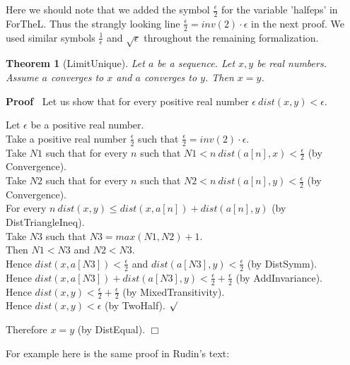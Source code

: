 \documentclass{article}
\newenvironment{forthel}{\begin{leftbar}}{\end{leftbar}}
\newenvironment{proof}{\noindent\textbf{Proof\ }}{\hspace*{\fill}$\Box$\medskip}
\newenvironment{subproof}{\begin{list}{}{}
		\item[\text{Proof}]}{\hfill $\surd$ \end{list}}
\newtheorem{theorem}{Theorem}
\newcommand{\halfeps}{\frac{\epsilon}{2}}
\newcommand{\inveps}{\frac{1}{\epsilon}}
\newcommand{\rooteps}{\sqrt{\epsilon}}
\begin{document}
\noindent Here we should note that we added the symbol $\halfeps$ for the variable 'halfeps' in ForTheL. Thus the strangly looking line $\halfeps = inv(2) \cdot \epsilon$ in the next proof. We used similar symbols $\inveps$ and $\rooteps$ throughout the remaining formalization.

\begin{forthel}
	\begin{theorem}[LimitUnique]
		Let $a$ be a sequence. Let $x, y$ be real numbers. Assume $a$ converges to $x$ and $a$ converges to $y$.
		Then $x = y$.
	\end{theorem}

	\begin{proof}
		Let us show that for every positive real number $\epsilon \ dist(x,y) < \epsilon$.
		\begin{subproof}
			Let $\epsilon$ be a positive real number.\\
			Take a positive real number $\halfeps$ such that $\halfeps = inv(2) \cdot \epsilon$.\\
			Take $N1$ such that for every $n$ such that $N1 < n \ dist(a[n],x) < \halfeps$ (by Convergence).\\
			Take $N2$ such that for every $n$ such that $N2 < n \ dist(a[n],y) < \halfeps$ (by Convergence).\\
			For every $n \ dist(x,y) \leq dist(x,a[n]) + dist(a[n],y)$ (by DistTriangleIneq). \\
			Take $N3$ such that $N3 = max(N1,N2) + 1$.\\
			Then $N1 < N3$ and $N2 < N3$.\\
			Hence $dist(x,a[N3]) < \halfeps$ and $dist(a[N3],y) < \halfeps$ (by DistSymm).\\
			Hence $dist(x,a[N3]) + dist(a[N3],y) < \halfeps + \halfeps$ (by AddInvariance).\\
			Hence $dist(x,y) < \halfeps + \halfeps$ (by MixedTransitivity).\\
			Hence $dist(x,y) < \epsilon$ (by TwoHalf).
		\end{subproof}
		Therefore $x = y$ (by DistEqual).
	\end{proof}
\end{forthel}

\noindent For example here is the same proof in Rudin's text:\\

\\
\end{document}
